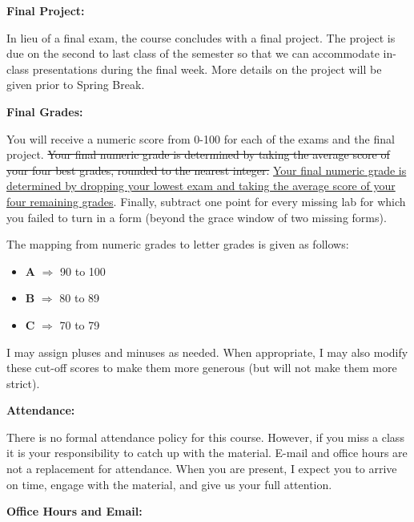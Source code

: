 \documentclass[12pt]{article}
\begin{document}
\vspace{0.4cm}

\textbf{Final Project:} \vspace{6pt}

In lieu of a final exam, the course concludes with a final project.
The project is due on the second to last class of the semester so that we can
accommodate in-class presentations during the final week. More details on the
project will be given prior to Spring Break.

\vspace{0.4cm}

\textbf{Final Grades:} \vspace{6pt}

You will receive a numeric score from 0-100 for each of the exams and the
final project. \st{Your final numeric grade is determined by taking the average
score of your four best grades, rounded to the nearest integer.} \ul{Your
final numeric grade is determined by dropping your lowest exam and taking
the average score of your four remaining grades}. Finally,
subtract one point for every missing lab for which you failed to turn in a
form (beyond the grace window of two missing forms).

\medskip

The mapping from numeric grades to letter grades is given as follows:
\begin{itemize}\setlength\itemsep{0em}
\item[] \textbf{A} $\Rightarrow$ 90 to 100
\item[] \textbf{B} $\Rightarrow$ 80 to 89
\item[] \textbf{C} $\Rightarrow$ 70 to 79
\end{itemize}
I may assign pluses and minuses as needed. When appropriate, I may also modify
these cut-off scores to make them more generous (but will not make them more
strict).

\vspace{0.4cm}

\textbf{Attendance:} \vspace{6pt}

There is no formal attendance policy for this course. However, if you miss a
class it is your responsibility to catch up with the material. E-mail and
office hours are not a replacement for attendance. When you are present,
I expect you to arrive on time, engage with the material, and give us your
full attention.

\newpage

\textbf{Office Hours and Email:} \vspace{6pt}
\end{document}
